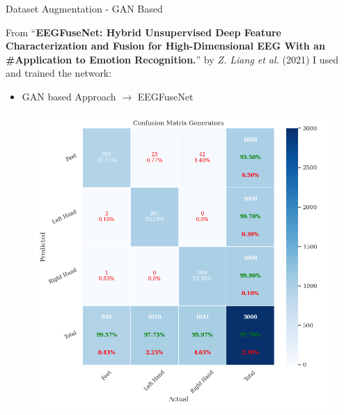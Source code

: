 \begin{frame}{Dataset Augmentation - GAN Based}
    \begin{minipage}[c]{.65\textwidth}
        From ``\textbf{EEGFuseNet: Hybrid Unsupervised Deep Feature Characterization and Fusion for High-Dimensional EEG With an \#Application to Emotion Recognition.}'' by \textit{Z. Liang et al.} (2021) I used and trained the network:
        \begin{itemize}
            \item GAN based Approach $\rightarrow{}$ EEGFuseNet
        \end{itemize}
    \end{minipage}
    \begin{minipage}[c]{.33\textwidth}
        \begin{figure}[htpb!]
            \centering
            \includegraphics[width=\textwidth]{figures/augmentation/gan/confusion_matrix_generators_generators_using_LSTMNet_0.5943600867678959.pkl}
        \end{figure}
    \end{minipage}
\end{frame}

